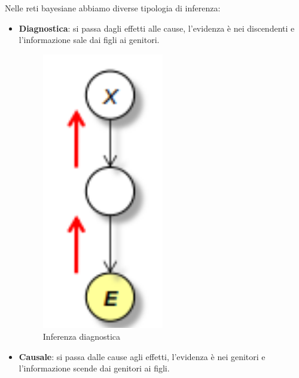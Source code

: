 Nelle reti bayesiane abbiamo diverse tipologia di inferenza:
\begin{itemize}
    \item \textbf{Diagnostica}: si passa dagli effetti alle cause, l'evidenza è
          nei discendenti e l'informazione sale dai figli ai genitori.
          \begin{figure}
              \centering
              \includegraphics[width=0.5\textwidth]{./img/Reti/Diagnostica.png}
              \caption{Inferenza diagnostica}
              \label{fig:diagnostica}
          \end{figure}
    \item \textbf{Causale}: si passa dalle cause agli effetti, l'evidenza è
          nei genitori e l'informazione scende dai genitori ai figli.
          \begin{figure}
              \centering

\end{figure}
\end{itemize}
